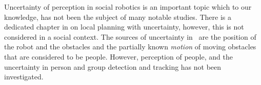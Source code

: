 Uncertainty of perception in social robotics is an important topic which to our knowledge, has not been the subject of many notable studies. There is a dedicated chapter in \cite{correa2014uncertainty} on local planning with uncertainty, however, this is not considered in a social context. The sources of uncertainty in~\cite{correa2014uncertainty} are the position of the robot and the obstacles and the partially known \emph{motion} of moving obstacles that are considered to be people. However, perception of people, and the uncertainty in person and group detection and tracking has not been investigated.


